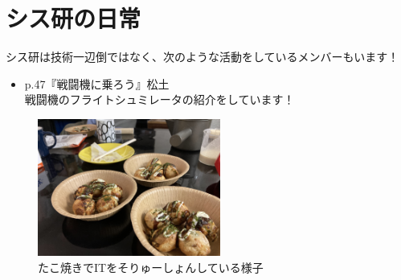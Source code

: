 \chapter{シス研の日常}

シス研は技術一辺倒ではなく、次のような活動をしているメンバーもいます！

\begin{tcolorbox}[title=お品書き]
  \begin{itemize}
    \item p.47『戦闘機に乗ろう』松土 \\
          戦闘機のフライトシュミレータの紹介をしています！
  \end{itemize} 
\end{tcolorbox}

\begin{figure}[H]
  \centering
  \includegraphics[width=6cm]{./image/04-Intarasting/takoyaki_soryusyon.jpg}
  \caption{たこ焼きでITをそりゅーしょんしている様子}
  \label{takoyaki_soryusyon}
\end{figure}